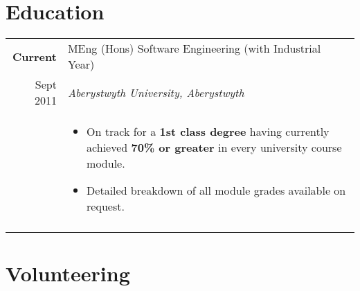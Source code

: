 \documentclass[a4paper, 10pt]{extarticle} %
\begin{document}
\section{Education}

\begin{tabular}{r | p{13cm}}	


\textbf{Current}
		
		 & 
		 
		 MEng (Hons) Software Engineering (with Industrial Year)  \\
		 
			Sept 2011
		 
		& 
		 
		\textit{Aberystwyth University, Aberystwyth} \\ 
		
& 

\footnotesize{

\vspace{-0.3cm}

\begin{itemize}[leftmargin=*]
\item On track for a \textbf{1st class degree} having currently achieved \textbf{70\% or greater} in every university course module. 

\item Detailed breakdown of all module grades available on request.

\vspace{-0.4cm}

\end{itemize}
} \\

\multicolumn{2}{c}{}

\end{tabular}

\section{Volunteering}
\end{document}
